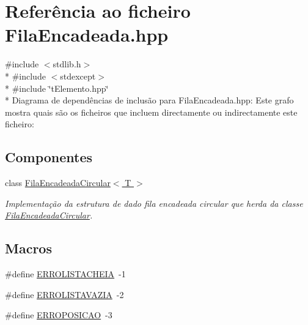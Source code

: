 \hypertarget{a00011}{\section{Referência ao ficheiro Fila\+Encadeada.\+hpp}
\label{a00011}
}
{\ttfamily \#include $<$stdlib.\+h$>$}\\*
{\ttfamily \#include $<$stdexcept$>$}\\*
{\ttfamily \#include \char`\"{}t\+Elemento.\+hpp\char`\"{}}\\*
Diagrama de dependências de inclusão para Fila\+Encadeada.\+hpp\+:
Este grafo mostra quais são os ficheiros que incluem directamente ou indirectamente este ficheiro\+:
\subsection*{Componentes}
\begin{DoxyCompactItemize}
\item 
class \hyperlink{a00003}{Fila\+Encadeada\+Circular$<$ T $>$}
\begin{DoxyCompactList}\small\item\em Implementação da estrutura de dado fila encadeada circular que herda da classe \hyperlink{a00003}{Fila\+Encadeada\+Circular}. \end{DoxyCompactList}\end{DoxyCompactItemize}
\subsection*{Macros}
\begin{DoxyCompactItemize}
\item 
\#define \hyperlink{a00011_a954d131665f170b5f0b9ad3083e27599}{E\+R\+R\+O\+L\+I\+S\+T\+A\+C\+H\+E\+I\+A}~-\/1
\item 
\#define \hyperlink{a00011_ac6a2228a8da72468def0d5cd7c50855c}{E\+R\+R\+O\+L\+I\+S\+T\+A\+V\+A\+Z\+I\+A}~-\/2
\item 
\#define \hyperlink{a00011_a276133910d00a9e29f3fa4c43b6af705}{E\+R\+R\+O\+P\+O\+S\+I\+C\+A\+O}~-\/3
\end{DoxyCompactItemize}



